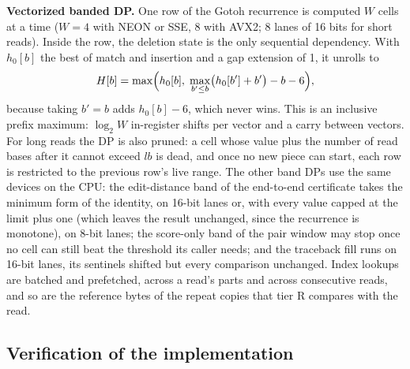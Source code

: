 \documentclass[11pt]{article}
\theoremstyle{definition}
\begin{document}
\textbf{Vectorized banded DP.} One row of the Gotoh recurrence is computed
$W$ cells at a time ($W=4$ with NEON or SSE, $8$ with AVX2; 8 lanes of 16
bits for short reads). Inside the row, the deletion state is the only
sequential dependency. With $h_0[b]$ the best of match and insertion and a
gap extension of 1, it unrolls to
\[
H[b] = \max\Bigl(h_0[b],\; \max_{b'\le b}\bigl(h_0[b']+b'\bigr) - b - 6\Bigr),
\]
because taking $b'=b$ adds $h_0[b]-6$, which never wins. This is an
inclusive prefix maximum: $\log_2 W$ in-register shifts per vector and a
carry between vectors. For long reads the DP is also pruned: a cell whose
value plus the number of read bases after it cannot exceed $lb$ is dead,
and once no new piece can start, each row is restricted to the previous
row's live range. The other band DPs use the same devices on the CPU: the
edit-distance band of the end-to-end certificate takes the minimum form
of the identity, on 16-bit lanes or, with every value capped at the limit
plus one (which leaves the result unchanged, since the recurrence is
monotone), on 8-bit lanes; the score-only band of the pair window may stop
once no cell can still beat the threshold its caller needs; and the
traceback fill runs on 16-bit lanes, its sentinels shifted but every
comparison unchanged. Index lookups are batched and prefetched, across a
read's parts and across consecutive reads, and so are the reference bytes
of the repeat copies that tier R compares with the read.

\subsection{Verification of the implementation}\label{sec:verify}
\end{document}
